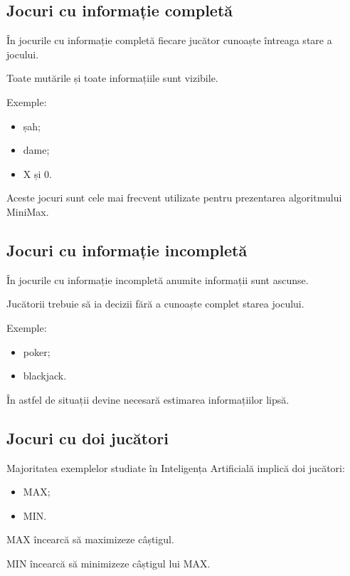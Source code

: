 \documentclass[12pt,a4paper]{article}
\begin{document}
\subsection{Jocuri cu informație completă}

În jocurile cu informație completă fiecare jucător cunoaște întreaga stare a jocului.

Toate mutările și toate informațiile sunt vizibile.

Exemple:

\begin{itemize}
\item șah;
\item dame;
\item X și 0.
\end{itemize}

Aceste jocuri sunt cele mai frecvent utilizate pentru prezentarea algoritmului MiniMax.

\subsection{Jocuri cu informație incompletă}

În jocurile cu informație incompletă anumite informații sunt ascunse.

Jucătorii trebuie să ia decizii fără a cunoaște complet starea jocului.

Exemple:

\begin{itemize}
\item poker;
\item blackjack.
\end{itemize}

În astfel de situații devine necesară estimarea informațiilor lipsă.

\subsection{Jocuri cu doi jucători}

Majoritatea exemplelor studiate în Inteligența Artificială implică doi jucători:

\begin{itemize}
\item MAX;
\item MIN.
\end{itemize}

MAX încearcă să maximizeze câștigul.

MIN încearcă să minimizeze câștigul lui MAX.
\end{document}
